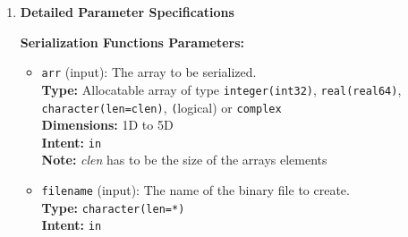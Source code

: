 \documentclass[11pt]{article}
\begin{document}
\begin{enumerate}
\begin{enumerate}
\begin{itemize}
	      	      	\item \texttt{serialize\_logical\_Nd(arr, filename, ierr)} -
	      	      	      Serialize N-dimensional logical arrays.
	      	      	      
	      	      	\item \texttt{deserialize\_logical\_Nd(arr, filename, ierr)} -
	      	      	      Deserialize N-dimensional logical arrays.
	      	      	      
	      	      	\item \texttt{serialize\_complex\_Nd(arr, filename, ierr)} -
	      	      	      Serialize N-dimensional complex arrays.
	      	      	      
	      	      	\item \texttt{deserialize\_complex\_Nd(arr, filename, ierr)} -
	      	      	      Deserialize N-dimensional complex arrays.
	      	      	      
	      	      	\item \texttt{get\_array\_metadata(filename, dims, max\_dims, ndims,
	      	      	      ierr, [clen])} - Retrieve array metadata from files
	      	      \end{itemize}
	      	      
	      	      Where N represents the array dimension (1-5).
	      	      
	      	\item \textbf{Detailed Parameter Specifications}
	      	      
	      	      \textbf{Serialization Functions Parameters:}
	      	      \begin{itemize}
	      	      	\item \texttt{arr} (input): The array to be serialized. \\ \textbf{Type:}
	      	      	      Allocatable array of type \texttt{integer(int32)}, \texttt{real(real64)},
	      	      	      \texttt{character(len=clen)}, \texttt{(}logical) or \texttt{complex}
	      	      	      \\ \textbf{Dimensions:} 1D to 5D \\ \textbf{Intent:} \texttt{in}
	      	      	      \\ \textbf{Note:} \textit{clen} has to be the size of the arrays
	      	      	      elements
	      	      	      
	      	      	\item \texttt{filename} (input): The name of the binary file to create.
	      	      	      \\ \textbf{Type:} \texttt{character(len=*)} \\ \textbf{Intent:} \texttt{in}
	      	      	      

\end{itemize}
\end{enumerate}
\end{enumerate}
\end{document}
